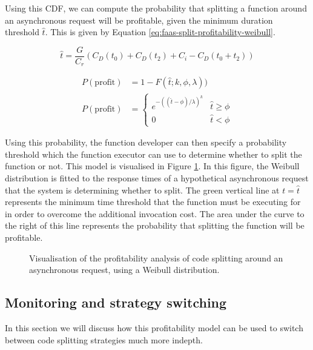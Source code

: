 Using this CDF, we can compute the probability that splitting a function around an asynchronous request will be profitable, given the minimum duration threshold $\hat{t}$. This is given by Equation \ref{eq:faas-split-profitability-weibull}.

\begin{equation}
\hat{t} = \frac{G}{C_r} \left( C_D(t_0) + C_D(t_2) + C_i - C_D(t_0 + t_2) \right)
\end{equation}

\begin{equation} \label{eq:faas-split-profitability-weibull}
\begin{aligned}
P(\mathrm{profit}) & = 1 - F(\hat{t}; k, \phi, \lambda)) \\
P(\mathrm{profit}) & =
    \begin{cases}
    e^{-((\hat{t} - \phi)/\lambda)^k} & \hat{t} \geq \phi \\
    0 & \hat{t} < \phi
    \end{cases}
\end{aligned}
\end{equation}

Using this probability, the function developer can then specify a probability threshold which the function executor can use to determine whether to split the function or not. This model is visualised in Figure \ref{fig:splitting-profitability-analysis-weibull-fit}. In this figure, the Weibull distribution is fitted to the response times of a hypothetical asynchronous request that the system is determining whether to split. The green vertical line at $t = \hat{t}$ represents the minimum time threshold that the function must be executing for in order to overcome the additional invocation cost. The area under the curve to the right of this line represents the probability that splitting the function will be profitable.

\begin{figure}
    \begin{center}
        
    \end{center}
    \caption{Visualisation of the profitability analysis of code splitting around an asynchronous request, using a Weibull distribution.}
    \label{fig:splitting-profitability-analysis-weibull-fit}
\end{figure}

\subsection{Monitoring and strategy switching}
\label{sec:faaas-monitoring-and-strat-switching-design}
In this section we will discuss how this profitability model can be used to switch between code splitting strategies much more indepth.

